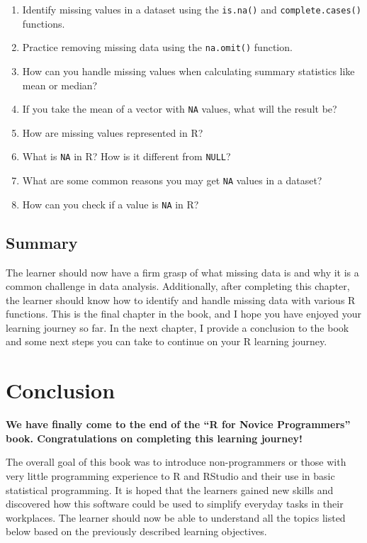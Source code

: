 \documentclass[
  letterpaper,
  DIV=11,
  numbers=noendperiod]{scrreprt}
\begin{document}
\begin{enumerate}
\def\labelenumi{\roman{enumi}.}
\item
  Identify missing values in a dataset using the \texttt{is.na()} and
  \texttt{complete.cases()} functions.
\item
  Practice removing missing data using the \texttt{na.omit()} function.
\item
  How can you handle missing values when calculating summary statistics
  like mean or median?
\item
  If you take the mean of a vector with \texttt{NA} values, what will
  the result be?
\item
  How are missing values represented in R?
\item
  What is \texttt{NA} in R? How is it different from \texttt{NULL}?
\item
  What are some common reasons you may get \texttt{NA} values in a
  dataset?
\item
  How can you check if a value is \texttt{NA} in R?
\end{enumerate}

\section{Summary}\label{summary-11}

The learner should now have a firm grasp of what missing data is and why
it is a common challenge in data analysis. Additionally, after
completing this chapter, the learner should know how to identify and
handle missing data with various R functions. This is the final chapter
in the book, and I hope you have enjoyed your learning journey so far.
In the next chapter, I provide a conclusion to the book and some next
steps you can take to continue on your R learning journey.


\chapter*{Conclusion}\label{conclusion-1}


\textbf{We have finally come to the end of the ``R for Novice
Programmers'' book. Congratulations on completing this learning
journey!}

The overall goal of this book was to introduce non-programmers or those
with very little programming experience to R and RStudio and their use
in basic statistical programming. It is hoped that the learners gained
new skills and discovered how this software could be used to simplify
everyday tasks in their workplaces. The learner should now be able to
understand all the topics listed below based on the previously described
learning objectives.
\end{document}
